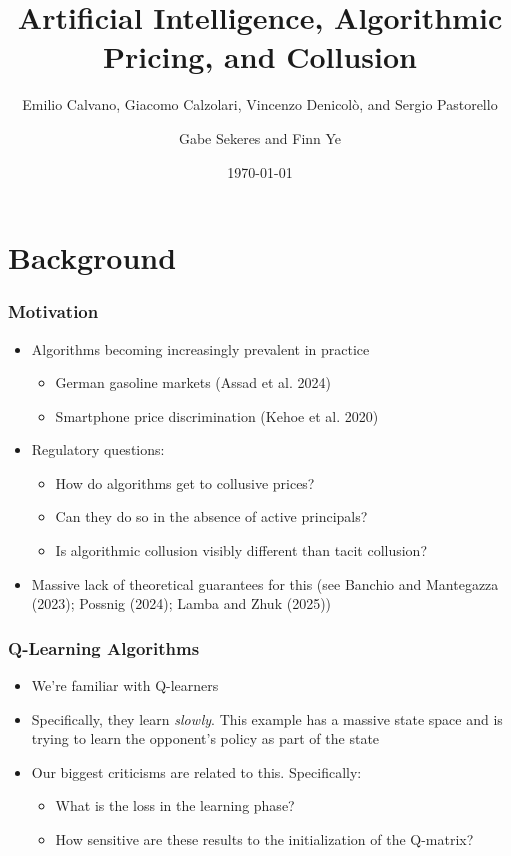 \documentclass{beamer}
\title{Artificial Intelligence, Algorithmic Pricing, and Collusion}
\subtitle{Emilio Calvano, Giacomo Calzolari, Vincenzo Denicol\`{o}, and Sergio Pastorello}
\date{\today}
\author{Gabe Sekeres and Finn Ye}
\institute{Cornell University}
\begin{document}
\begin{frame}
	\titlepage
\end{frame}


\section{Background}

\begin{frame}\frametitle{Motivation}
	\begin{itemize}
		\item Algorithms becoming increasingly prevalent in practice
		\begin{itemize}
			\item German gasoline markets (Assad et al. 2024)
			\item Smartphone price discrimination (Kehoe et al. 2020)
		\end{itemize}
		\item Regulatory questions: \begin{itemize} \item How do algorithms get to collusive prices? \item Can they do so in the absence of active principals? \item Is algorithmic collusion visibly different than tacit collusion? \end{itemize}
		\item Massive lack of theoretical guarantees for this (see Banchio and Mantegazza (2023); Possnig (2024); Lamba and Zhuk (2025))
	\end{itemize}	
\end{frame}

\begin{frame}\frametitle{Q-Learning Algorithms}
	\begin{itemize}
		\item We're familiar with Q-learners 
		\item Specifically, they learn \emph{slowly}. This example has a massive state space and is trying to learn the opponent's policy as part of the state
		\item Our biggest criticisms are related to this. Specifically: \begin{itemize} \item What is the loss in the learning phase? \item How sensitive are these results to the initialization of the Q-matrix?\end{itemize}
	\end{itemize}
\end{frame}
\end{document}
